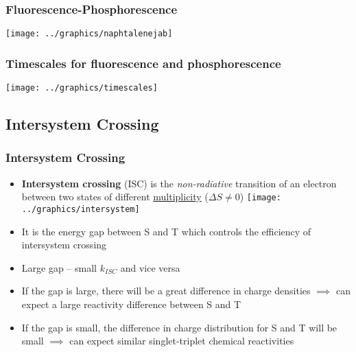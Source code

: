 \documentclass[ignorenonframetext]{beamer}
\begin{document}
\begin{frame}
\frametitle{Fluorescence-Phosphorescence}

\texttt{[image: ../graphics/naphtalenejab]}\\

\end{frame}

\begin{frame}
\frametitle{Timescales for fluorescence and phosphorescence}

\texttt{[image: ../graphics/timescales]}
\end{frame}

%
%

\subsection{Intersystem Crossing}

\begin{frame}
\frametitle{Intersystem Crossing}
\begin{itemize}
\item \textbf{Intersystem crossing} (ISC) is the \emph{non-radiative} transition of an electron between two states of different \underline{multiplicity} (\(\Delta S \neq 0\)) \texttt{[image: ../graphics/intersystem]}
\item It is the energy gap between S and T which controls the efficiency of intersystem crossing
\item Large gap -- small \(k_{ISC}\) and vice versa
\item If the gap is large, there will be a great difference in charge densities \(\implies\) can expect a large reactivity difference between S and T
\item If the gap is small, the difference in charge distribution for S and T will be small \(\implies\) can expect similar singlet-triplet chemical reactivities
\end{itemize}
\end{frame}
\end{document}
